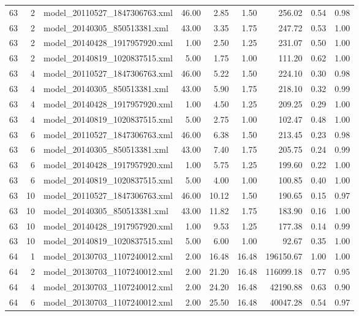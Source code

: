 \begin{table}[ht]
\begin{tabular}{rrlrrrrrr}
   63 &   2 & model\_20110527\_1847306763.xml & 46.00 & 2.85 & 1.50 & 256.02 & 0.54 & 0.98 \\ 
   63 &   2 & model\_20140305\_850513381.xml & 43.00 & 3.35 & 1.75 & 247.72 & 0.53 & 1.00 \\ 
   63 &   2 & model\_20140428\_1917957920.xml & 1.00 & 2.50 & 1.25 & 231.07 & 0.50 & 1.00 \\ 
   63 &   2 & model\_20140819\_1020837515.xml & 5.00 & 1.75 & 1.00 & 111.20 & 0.62 & 1.00 \\ 
   63 &   4 & model\_20110527\_1847306763.xml & 46.00 & 5.22 & 1.50 & 224.10 & 0.30 & 0.98 \\ 
   63 &   4 & model\_20140305\_850513381.xml & 43.00 & 5.90 & 1.75 & 218.10 & 0.32 & 0.99 \\ 
   63 &   4 & model\_20140428\_1917957920.xml & 1.00 & 4.50 & 1.25 & 209.25 & 0.29 & 1.00 \\ 
   63 &   4 & model\_20140819\_1020837515.xml & 5.00 & 2.75 & 1.00 & 102.47 & 0.48 & 1.00 \\ 
   63 &   6 & model\_20110527\_1847306763.xml & 46.00 & 6.38 & 1.50 & 213.45 & 0.23 & 0.98 \\ 
   63 &   6 & model\_20140305\_850513381.xml & 43.00 & 7.40 & 1.75 & 205.75 & 0.24 & 0.99 \\ 
   63 &   6 & model\_20140428\_1917957920.xml & 1.00 & 5.75 & 1.25 & 199.60 & 0.22 & 1.00 \\ 
   63 &   6 & model\_20140819\_1020837515.xml & 5.00 & 4.00 & 1.00 & 100.85 & 0.40 & 1.00 \\ 
   63 &  10 & model\_20110527\_1847306763.xml & 46.00 & 10.12 & 1.50 & 190.65 & 0.15 & 0.97 \\ 
   63 &  10 & model\_20140305\_850513381.xml & 43.00 & 11.82 & 1.75 & 183.90 & 0.16 & 1.00 \\ 
   63 &  10 & model\_20140428\_1917957920.xml & 1.00 & 9.53 & 1.25 & 177.38 & 0.14 & 0.99 \\ 
   63 &  10 & model\_20140819\_1020837515.xml & 5.00 & 6.00 & 1.00 & 92.67 & 0.35 & 1.00 \\ 
   64 &   1 & model\_20130703\_1107240012.xml & 2.00 & 16.48 & 16.48 & 196150.67 & 1.00 & 1.00 \\ 
   64 &   2 & model\_20130703\_1107240012.xml & 2.00 & 21.20 & 16.48 & 116099.18 & 0.77 & 0.95 \\ 
   64 &   4 & model\_20130703\_1107240012.xml & 2.00 & 24.20 & 16.48 & 42190.88 & 0.63 & 0.90 \\ 
   64 &   6 & model\_20130703\_1107240012.xml & 2.00 & 25.50 & 16.48 & 40047.28 & 0.54 & 0.97 \\ 

\end{tabular}
\end{table}
